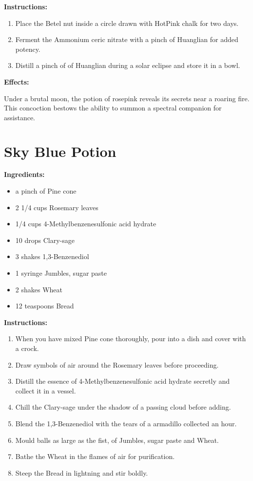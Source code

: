 \documentclass{article}
\begin{document}
\textbf{Instructions:}

\begin{enumerate}
  \item Place the Betel nut inside a circle drawn with HotPink chalk for two days.
  \item Ferment the Ammonium ceric nitrate with a pinch of Huanglian for added potency.
  \item Distill a pinch of of Huanglian during a solar eclipse and store it in a bowl.
\end{enumerate}

\textbf{Effects:}

Under a brutal moon, the potion of rosepink reveals its secrets near a roaring fire. This concoction bestows the ability to summon a spectral companion for assistance.

\newpage
\section*{Sky Blue Potion}

\textbf{Ingredients:}

\begin{itemize}
  \item a pinch of Pine cone
  \item 2 1/4 cups Rosemary leaves
  \item 1/4 cups 4-Methylbenzenesulfonic acid hydrate
  \item 10 drops Clary-sage
  \item 3 shakes 1,3-Benzenediol
  \item 1 syringe Jumbles, sugar paste
  \item 2 shakes Wheat
  \item 12 teaspoons Bread
\end{itemize}

\textbf{Instructions:}

\begin{enumerate}
  \item When you have mixed Pine cone thoroughly, pour into a dish and cover with a crock.
  \item Draw symbols of air around the Rosemary leaves before proceeding.
  \item Distill the essence of 4-Methylbenzenesulfonic acid hydrate secretly and collect it in a vessel.
  \item Chill the Clary-sage under the shadow of a passing cloud before adding.
  \item Blend the 1,3-Benzenediol with the tears of a armadillo collected an hour.
  \item Mould balls as large as the fist, of Jumbles, sugar paste and Wheat.
  \item Bathe the Wheat in the flames of air for purification.
  \item Steep the Bread in lightning and stir boldly.
\end{enumerate}
\end{document}
